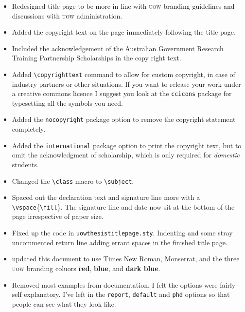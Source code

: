 \documentclass[12pt,oneside]{article}
\newcommand{\option}[1]{\texttt{\color{UOWblue}#1}}
\newcommand{\command}[1]{\texttt{\color{UOWred}#1}}
\begin{document}
\begin{itemize}
  \item Redesigned title page to be more in line with \textsc{uow} branding guidelines and discussions with \textsc{uow} administration.
  \item Added the copyright text on the page immediately following the title page.
  \item Included the acknowledgement of the Australian Government Research Training Partnership Scholarships in the copy right text.
  \item Added \command{\textbackslash{}copyrighttext} command to allow for custom copyright, in case of industry partners or other situations. If you want to release your work under a creative commons licence I suggest you look at the \texttt{ccicons} package for typesetting all the symbols you need.
  \item Added the \option{nocopyright} package option to remove the copyright statement completely.
  \item Added the \option{international} package option to print the copyright text, but to omit the acknowledgment of scholarship, which is only required for \emph{domestic} students.
  \item Changed the \command{\textbackslash{}class} macro to \command{\textbackslash{}subject}.
  \item Spaced out the declaration text and signature line more with a \command{\textbackslash{}vspace}\{\command{\textbackslash{}fill}\}. The signature line and date now sit at the bottom of the page irrespective of paper size.
  \item Fixed up the code in \texttt{uowthesistitlepage.sty}. Indenting and some stray uncommented return line adding errant spaces in the finished title page.
  \item updated this document to use Times New Roman, \textsf{Monserrat}, and the three \textsc{uow} branding coluors \textcolor{UOWred}{\textbf{red}}, \textcolor{UOWblue}{\textbf{blue}}, and \textcolor{UOWdarkblue}{\textbf{dark blue}}.
  \item Removed most examples from documentation. I felt the options were fairly self explanatory. I've left in the \option{report}, \option{default} and \option{phd} options so that people can see what they look like.
\end{itemize}
\end{document}
